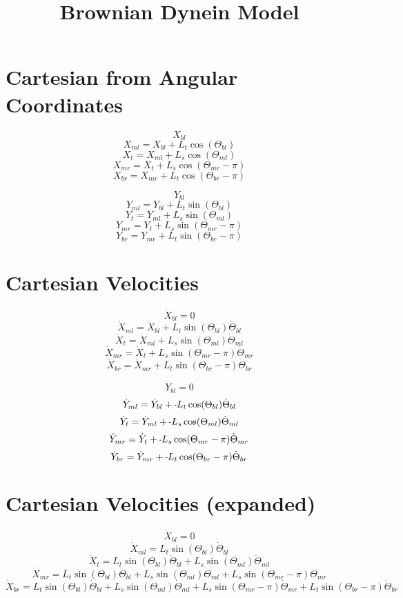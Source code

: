 \documentclass[11pt, landscape]{article}
\title{Brownian Dynein Model}
\newcommand{\mn}{\scalebox{0.7}[1.0]{-}}
\begin{document}
\maketitle

\section{Cartesian from Angular Coordinates}
$$X_{bl}$$
$$X_{ml} = X_{bl}+L_{t}\cos(\Theta_{bl})$$
$$X_{t}  = X_{ml}+L_{s}\cos(\Theta_{ml})$$
$$X_{mr} = X_{t} +L_{s}\cos(\Theta_{mr}-\pi)$$
$$X_{br} = X_{mr}+L_{t}\cos(\Theta_{br}-\pi)$$

$$Y_{bl}$$
$$Y_{ml} = Y_{bl}+L_{t}\sin(\Theta_{bl})$$
$$Y_{t}  = Y_{ml}+L_{s}\sin(\Theta_{ml})$$
$$Y_{mr} = Y_{t} +L_{s}\sin(\Theta_{mr}-\pi)$$
$$Y_{br} = Y_{mr}+L_{t}\sin(\Theta_{br}-\pi)$$

\section{Cartesian Velocities}
$$\dot{X}_{bl} = 0$$
$$\dot{X}_{ml} = \dot{X}_{bl} + L_{t}\sin(\Theta_{bl})      \dot{\Theta}_{bl}$$
$$\dot{X}_{t } = \dot{X}_{ml} + L_{s}\sin(\Theta_{ml})      \dot{\Theta}_{ml}$$
$$\dot{X}_{mr} = \dot{X}_{t } + L_{s}\sin(\Theta_{mr}-\pi)  \dot{\Theta}_{mr}$$
$$\dot{X}_{br} = \dot{X}_{mr} + L_{t}\sin(\Theta_{br}-\pi)  \dot{\Theta}_{br}$$
                                                                               
$$\dot{Y}_{bl} = 0$$                                                               
$$\dot{Y}_{ml} = \dot{Y}_{bl} + \mn L_{t}\cos(\Theta_{bl})      \dot{\Theta}_{bl}$$
$$\dot{Y}_{t}  = \dot{Y}_{ml} + \mn L_{s}\cos(\Theta_{ml})      \dot{\Theta}_{ml}$$
$$\dot{Y}_{mr} = \dot{Y}_{t } + \mn L_{s}\cos(\Theta_{mr}-\pi)  \dot{\Theta}_{mr}$$
$$\dot{Y}_{br} = \dot{Y}_{mr} + \mn L_{t}\cos(\Theta_{br}-\pi)  \dot{\Theta}_{br}$$

\section{Cartesian Velocities (expanded)}
$$\dot{X}_{bl} = 0$$
$$\dot{X}_{ml} = L_{t}\sin(\Theta_{bl})  \dot{\Theta}_{bl}$$
$$\dot{X}_{t } = L_{t}\sin(\Theta_{bl})  \dot{\Theta}_{bl} + L_{s}\sin(\Theta_{ml})      \dot{\Theta}_{ml}$$
$$\dot{X}_{mr} = L_{t}\sin(\Theta_{bl})  \dot{\Theta}_{bl} + L_{s}\sin(\Theta_{ml})      \dot{\Theta}_{ml} + L_{s}\sin(\Theta_{mr}-\pi)  \dot{\Theta}_{mr}$$
$$\dot{X}_{br} = L_{t}\sin(\Theta_{bl})  \dot{\Theta}_{bl} + L_{s}\sin(\Theta_{ml})      \dot{\Theta}_{ml} + L_{s}\sin(\Theta_{mr}-\pi)  \dot{\Theta}_{mr} + L_{t}\sin(\Theta_{br}-\pi)  \dot{\Theta}_{br}$$
                                                                               
\end{document}
